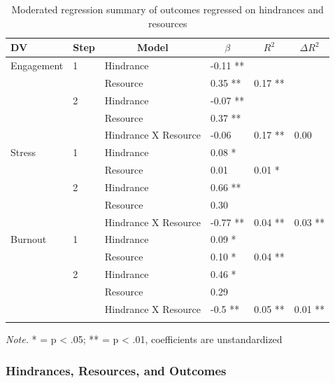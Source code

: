 \documentclass[
  man]{apa7}
\begin{document}
\begin{table}[tbp]

\begin{center}
\begin{threeparttable}

\caption{\label{tab:hind-resource-table}Moderated regression summary of outcomes regressed on hindrances and resources}

\begin{tabular}{llllll}
\toprule
DV & \multicolumn{1}{c}{Step} & \multicolumn{1}{c}{Model} & \multicolumn{1}{c}{$\beta$} & \multicolumn{1}{c}{$R^2$} & \multicolumn{1}{c}{$\Delta R^2$}\\
\midrule
Engagement & 1 & Hindrance & -0.11 ** &  & \\
 &  & Resource & 0.35 ** & 0.17 ** & \\
 & 2 & Hindrance & -0.07 ** &  & \\
 &  & Resource & 0.37 ** &  & \\
 &  & Hindrance X Resource & -0.06 & 0.17 ** & 0.00\\
Stress & 1 & Hindrance & 0.08 * &  & \\
 &  & Resource & 0.01 & 0.01 * & \\
 & 2 & Hindrance & 0.66 ** &  & \\
 &  & Resource & 0.30 &  & \\
 &  & Hindrance X Resource & -0.77 ** & 0.04 ** & 0.03 **\\
Burnout & 1 & Hindrance & 0.09 * &  & \\
 &  & Resource & 0.10 * & 0.04 ** & \\
 & 2 & Hindrance & 0.46 * &  & \\
 &  & Resource & 0.29 &  & \\
 &  & Hindrance X Resource & -0.5 ** & 0.05 ** & 0.01 **\\
\bottomrule
\addlinespace
\end{tabular}

\begin{tablenotes}[para]
\normalsize{\textit{Note.} * = p < .05; ** = p < .01, coefficients are unstandardized}
\end{tablenotes}

\end{threeparttable}
\end{center}

\end{table}

\hypertarget{hindrances-resources-and-outcomes}{%
\subsubsection{Hindrances, Resources, and Outcomes}\label{hindrances-resources-and-outcomes}}
\end{document}
